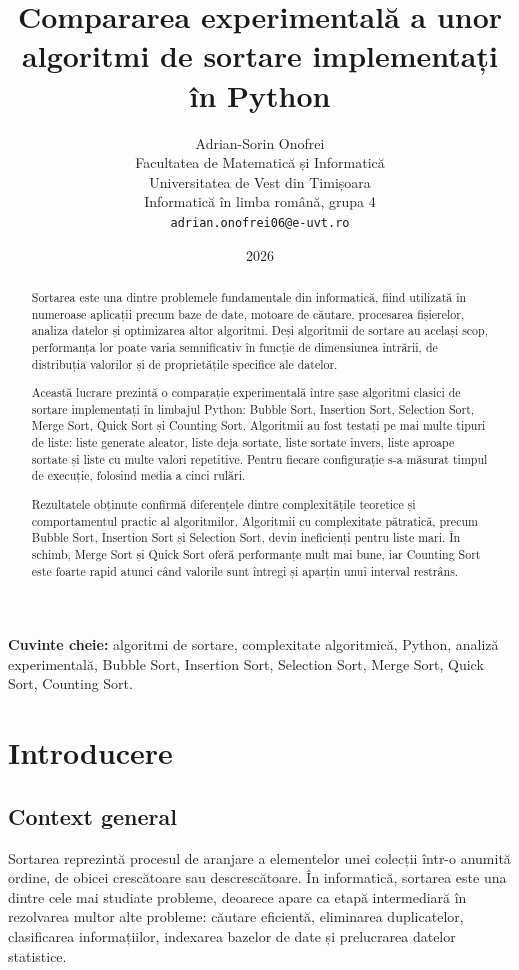 \documentclass[a4paper,12pt]{article}
\title{\textbf{Compararea experimentală a unor algoritmi de sortare implementați în Python}}
\author{
Adrian-Sorin Onofrei\\
Facultatea de Matematică și Informatică\\
Universitatea de Vest din Timișoara\\
Informatică în limba română, grupa 4\\
\texttt{adrian.onofrei06@e-uvt.ro}
}
\date{2026}
\begin{document}
\maketitle

\begin{abstract}
Sortarea este una dintre problemele fundamentale din informatică, fiind utilizată în numeroase aplicații precum baze de date, motoare de căutare, procesarea fișierelor, analiza datelor și optimizarea altor algoritmi. Deși algoritmii de sortare au același scop, performanța lor poate varia semnificativ în funcție de dimensiunea intrării, de distribuția valorilor și de proprietățile specifice ale datelor.

Această lucrare prezintă o comparație experimentală între șase algoritmi clasici de sortare implementați în limbajul Python: Bubble Sort, Insertion Sort, Selection Sort, Merge Sort, Quick Sort și Counting Sort. Algoritmii au fost testați pe mai multe tipuri de liste: liste generate aleator, liste deja sortate, liste sortate invers, liste aproape sortate și liste cu multe valori repetitive. Pentru fiecare configurație s-a măsurat timpul de execuție, folosind media a cinci rulări.

Rezultatele obținute confirmă diferențele dintre complexitățile teoretice și comportamentul practic al algoritmilor. Algoritmii cu complexitate pătratică, precum Bubble Sort, Insertion Sort și Selection Sort, devin ineficienți pentru liste mari. În schimb, Merge Sort și Quick Sort oferă performanțe mult mai bune, iar Counting Sort este foarte rapid atunci când valorile sunt întregi și aparțin unui interval restrâns.
\end{abstract}

\vspace{0.4cm}

\noindent\textbf{Cuvinte cheie:} algoritmi de sortare, complexitate algoritmică, Python, analiză experimentală, Bubble Sort, Insertion Sort, Selection Sort, Merge Sort, Quick Sort, Counting Sort.

\tableofcontents
\newpage

\section{Introducere}

\subsection{Context general}
Sortarea reprezintă procesul de aranjare a elementelor unei colecții într-o anumită ordine, de obicei crescătoare sau descrescătoare. În informatică, sortarea este una dintre cele mai studiate probleme, deoarece apare ca etapă intermediară în rezolvarea multor alte probleme: căutare eficientă, eliminarea duplicatelor, clasificarea informațiilor, indexarea bazelor de date și prelucrarea datelor statistice.
\end{document}
